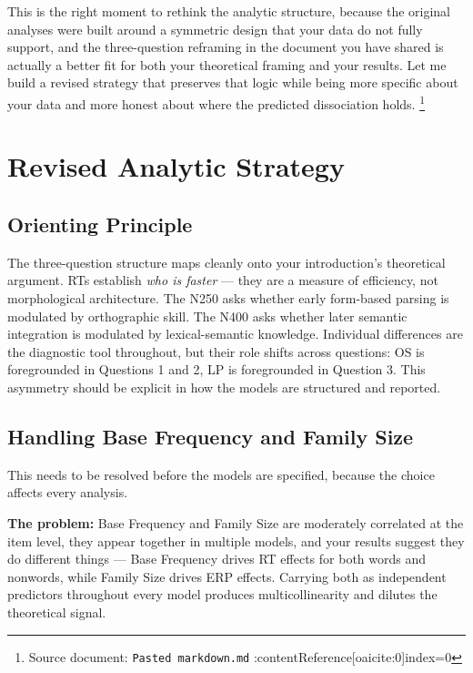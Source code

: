 \documentclass[12pt]{article}
\begin{document}
	
	This is the right moment to rethink the analytic structure, because the original analyses were built around a symmetric design that your data do not fully support, and the three-question reframing in the document you have shared is actually a better fit for both your theoretical framing and your results. Let me build a revised strategy that preserves that logic while being more specific about your data and more honest about where the predicted dissociation holds. \footnote{Source document: \texttt{Pasted markdown.md} :contentReference[oaicite:0]{index=0}}
	
	\section{Revised Analytic Strategy}
	
	\subsection{Orienting Principle}
	
	The three-question structure maps cleanly onto your introduction's theoretical argument. RTs establish \emph{who is faster} — they are a measure of efficiency, not morphological architecture. The N250 asks whether early form-based parsing is modulated by orthographic skill. The N400 asks whether later semantic integration is modulated by lexical-semantic knowledge. Individual differences are the diagnostic tool throughout, but their role shifts across questions: OS is foregrounded in Questions 1 and 2, LP is foregrounded in Question 3. This asymmetry should be explicit in how the models are structured and reported.
	
	\subsection{Handling Base Frequency and Family Size}
	
	This needs to be resolved before the models are specified, because the choice affects every analysis.
	
	\textbf{The problem:} Base Frequency and Family Size are moderately correlated at the item level, they appear together in multiple models, and your results suggest they do different things — Base Frequency drives RT effects for both words and nonwords, while Family Size drives ERP effects. Carrying both as independent predictors throughout every model produces multicollinearity and dilutes the theoretical signal.
	
\end{document}
